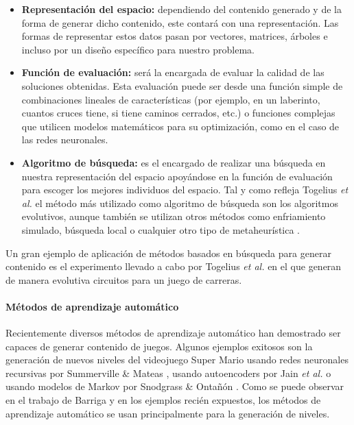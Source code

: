\begin{itemize}
    \item \textbf{Representación del espacio:} dependiendo del contenido generado y de la forma de generar dicho contenido, este contará con una representación. Las formas de representar estos datos pasan por vectores, matrices, árboles e incluso por un diseño específico para nuestro problema.
    \item \textbf{Función de evaluación:} será la encargada de evaluar la calidad de las soluciones obtenidas. Esta evaluación puede ser desde una función simple de combinaciones lineales de características (por ejemplo, en un laberinto, cuantos cruces tiene, si tiene caminos cerrados, etc.) o funciones complejas que utilicen modelos matemáticos para su optimización, como en el caso de las redes neuronales.
    \item \textbf{Algoritmo de búsqueda:} es el encargado de realizar una búsqueda en nuestra representación del espacio apoyándose en la función de evaluación para escoger los mejores individuos del espacio. Tal y como refleja Togelius \textit{et al.} \cite{togelius2011} el método más utilizado como algoritmo de búsqueda son los algoritmos evolutivos, aunque también se utilizan otros métodos como enfriamiento simulado, búsqueda local o cualquier otro tipo de metaheurística \cite{molina2020}.
\end{itemize}

Un gran ejemplo de aplicación de métodos basados en búsqueda para generar contenido es el experimento llevado a cabo por Togelius \textit{et al.} \cite{togelius2007} en el que generan de manera evolutiva circuitos para un juego de carreras.

\paragraph{Métodos de aprendizaje automático}

Recientemente diversos métodos de aprendizaje automático han demostrado ser capaces de generar contenido de juegos. Algunos ejemplos exitosos son la generación de nuevos niveles del videojuego Super Mario usando redes neuronales recursivas por Summerville \& Mateas \cite{summerville2016}, usando autoencoders por Jain \textit{et al.} \cite{jain2016} o usando modelos de Markov por Snodgrass \& Ontañón \cite{snodgrass2017}. Como se puede observar en el trabajo de Barriga \cite{barriga2019} y en los ejemplos recién expuestos, los métodos de aprendizaje automático se usan principalmente para la generación de niveles.

